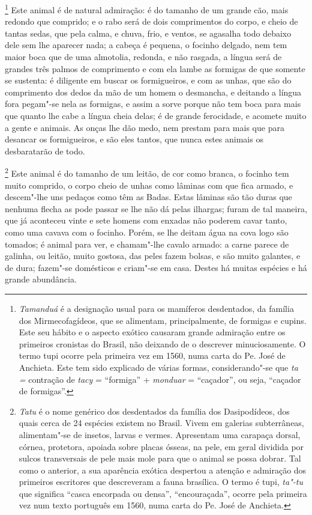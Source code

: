 \footnote{ \textit{Tamanduá} é a designação
usual para os mamíferos desdentados, da família dos Mirmecofagídeos,
que se alimentam, principalmente, de formigas e cupins. Este seu hábito
e o aspecto exótico causaram grande admiração entre os primeiros
cronistas do Brasil, não deixando de o descrever minuciosamente. O
termo tupi ocorre pela primeira vez em 1560, numa carta do Pe.
José de Anchieta. Este tem sido explicado de várias formas,
considerando"-se que \textit{ta =} contração de \textit{tacy} = 
``formiga'' + \textit{monduar} = ``caçador'', ou seja, ``caçador de
formigas''.} Este animal é de natural admiração: é do tamanho
de um grande cão, mais redondo que comprido; e o rabo será de dois
comprimentos do corpo, e cheio de tantas sedas, que pela calma, e
chuva, frio, e ventos, se agasalha todo debaixo dele sem lhe aparecer
nada; a cabeça é pequena, o focinho delgado, nem tem maior boca que de
uma almotolia, redonda, e não rasgada, a língua será de grandes três
palmos de comprimento e com ela lambe as formigas de que somente se
sustenta: é diligente em buscar os formigueiros, e com as unhas, que
são do comprimento dos dedos da mão de um homem o desmancha, e deitando
a língua fora pegam"-se nela as formigas, e assim a sorve porque não tem
boca para mais que quanto lhe cabe a língua cheia delas; é de grande
ferocidade, e acomete muito a gente e animais. As onças lhe dão medo,
nem prestam para mais que para desancar os formigueiros, e são eles
tantos, que nunca estes animais os desbaratarão de todo.

\footnote{ \textit{Tatu} é o nome genérico dos
desdentados da família dos Dasipodídeos, dos quais cerca de 24 
espécies existem no Brasil. Vivem em galerias subterrâneas,
alimentam"-se de insetos, larvas e vermes. Apresentam uma carapaça
dorsal, córnea, protetora, apoiada sobre placas ósseas, na pele, em
geral dividida por sulcos transversais de pele mais mole para que o
animal se possa dobrar. Tal como o anterior, a sua aparência exótica
despertou a atenção e admiração dos primeiros escritores que
descreveram a fauna brasílica. O termo é tupi, \textit{ta"-tu} que
significa ``casca encorpada ou densa'', ``encouraçada'', ocorre pela
primeira vez num texto português em 1560, numa carta do Pe.
José de Anchieta.} Este animal é do tamanho de um leitão, de
cor como branca, o focinho tem muito comprido, o corpo cheio de unhas
como lâminas com que fica armado, e descem"-lhe uns pedaços como têm as
Badas. Estas lâminas são tão duras que nenhuma flecha as pode passar se
lhe não dá pelas ilhargas; furam de tal maneira, que já aconteceu vinte
e sete homens com enxadas não poderem cavar tanto, como uma cavava com
o focinho. Porém, se lhe deitam água na cova logo são tomados; é animal
para ver, e chamam"-lhe cavalo armado: a carne parece de galinha, ou
leitão, muito gostosa, das peles fazem bolsas, e são muito galantes, e
de dura; fazem"-se domésticos e criam"-se em casa.
 Destes há muitas espécies e há grande abundância.

